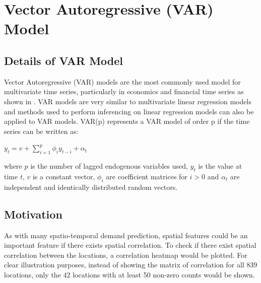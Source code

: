\documentclass[nonblindrev,msom]{informs3} %
\begin{document}
\section{Vector Autoregressive (VAR) Model}

\subsection{Details of VAR Model}
Vector Autoregressive (VAR) models are the most commonly used model for multivariate time series, particularly in economics and financial time series as shown in \cite{Hilde2000}. VAR models are very similar to multivariate linear regression models and methods used to perform inferencing on linear regression models can also be applied to VAR models. VAR(p) represents a VAR model of order p if the time series can be written as: 

\begin{center}
    $\displaystyle y_t=v+\sum_{i=1}^{p} \phi_{i}y_{t-i}+\alpha_t$
\end{center}

\noindent where $p$ is the number of lagged endogenous variables used, $y_t$ is the value at time $t$, $v$ is a constant vector, $\phi_i$ are coefficient matrices for $i>0$ and $\alpha_t$ are independent and identically distributed random vectors. 

\subsection{Motivation}

As with many spatio-temporal demand prediction, spatial features could be an important feature if there exists spatial correlation. To check if there exist spatial correlation between the locations, a correlation heatmap would be plotted. For clear illustration purposes, instead of showing the matrix of correlation for all 839 locations, only the 42 locations with at least 50 non-zero counts would be shown. 
\end{document}
